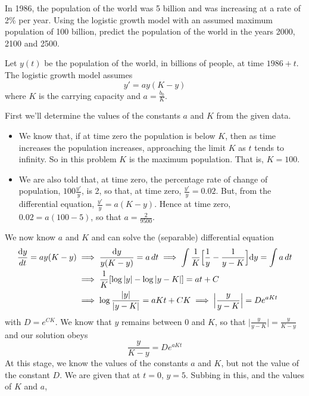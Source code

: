 \begin{eg}\label{eg:SDElogisticA}
 In 1986, the population of the world was 5 billion and was
increasing at a rate of 2\% per year. Using the logistic growth model
with an assumed maximum population of 100 billion, predict the population
of the world in the years 2000, 2100 and 2500.


\soln Let $y(t)$ be the population of the world, in billions of people,
at time $1986+t$. The logistic growth model assumes
\begin{equation*}
y'=ay(K-y)
\end{equation*}
where $K$ is the carrying capacity and $a=\frac{b_0}{K}$.

First we'll determine the values of the constants $a$ and $K$ from the
given data.
\begin{itemize}\itemsep1pt \parskip0pt  %
\item
We know  that, if at time zero the population is below $K$, then as time
increases the population increases, approaching the limit $K$ as $t$ tends
to infinity. So in this problem $K$ is the maximum population. That is,
$K=100$.
\item
 We are also told that, at time zero, the percentage rate of change
of population, $100\frac{y'}{y}$, is 2, so that, at time zero,
$\frac{y'}{y}=0.02$.
But, from the differential equation, $\frac{y'}{y}=a(K-y)$. Hence at time
zero, $0.02=a(100-5)$, so that $a= \frac{2}{9500}$.
\end{itemize}
We now know $a$ and $K$ and can solve the (separable) differential equation
\begin{align*}
\frac{\mathrm{d}y}{dt}=ay(K-y)&\implies
\frac{\mathrm{d}y}{y(K-y)}=a\,dt\implies
\int\frac{1}{K}\Big[\frac{1}{y}-\frac{1}{y-K}\Big]\mathrm{d}y=\int a\,dt\\
&\implies \frac{1}{K}[\log |y|-\log|y-K|]=at+C \\
&\implies  \log\frac{|y|}{|y-K|}=aKt+CK\implies
\Big|\frac{y}{y-K}\Big|=De^{aKt}
\end{align*}
with $D=e^{CK}$. We know that $y$ remains between $0$ and $K$, so that
$\Big|\frac{y}{y-K}\Big|=\frac{y}{K-y}$ and our solution obeys
\begin{equation*}
\frac{y}{K-y}=De^{aKt}
\end{equation*}
At this stage, we know the values of the constants $a$ and $K$, but not
the value of the constant $D$.
We are given that at $t=0$, $y=5$. Subbing in this, and the values of $K$
and $a$,
\begin{equation*}

\end{equation*}
\end{eg}
